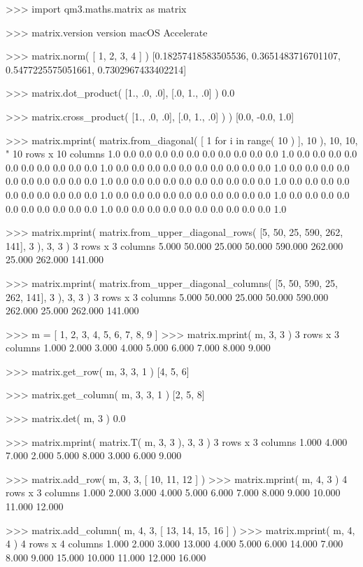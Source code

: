 \footnotesize
\begin{pyglist}[language=python,fvset={frame=single}]
>>> import qm3.maths.matrix as matrix

>>> matrix.version
version macOS Accelerate

>>> matrix.norm( [ 1, 2, 3, 4 ] )
[0.18257418583505536, 0.3651483716701107, 0.5477225575051661, 0.7302967433402214]

>>> matrix.dot_product( [1., .0, .0], [.0, 1., .0] )
0.0

>>> matrix.cross_product( [1., .0, .0], [.0, 1., .0] ) )
[0.0, -0.0, 1.0]

>>> matrix.mprint( matrix.from_diagonal( [ 1 for i in range( 10 ) ], 10 ), 10, 10, "%
10 rows x 10 columns
1.0 0.0 0.0 0.0 0.0 0.0 0.0 0.0 0.0 0.0 
0.0 1.0 0.0 0.0 0.0 0.0 0.0 0.0 0.0 0.0 
0.0 0.0 1.0 0.0 0.0 0.0 0.0 0.0 0.0 0.0 
0.0 0.0 0.0 1.0 0.0 0.0 0.0 0.0 0.0 0.0 
0.0 0.0 0.0 0.0 1.0 0.0 0.0 0.0 0.0 0.0 
0.0 0.0 0.0 0.0 0.0 1.0 0.0 0.0 0.0 0.0 
0.0 0.0 0.0 0.0 0.0 0.0 1.0 0.0 0.0 0.0 
0.0 0.0 0.0 0.0 0.0 0.0 0.0 1.0 0.0 0.0 
0.0 0.0 0.0 0.0 0.0 0.0 0.0 0.0 1.0 0.0 
0.0 0.0 0.0 0.0 0.0 0.0 0.0 0.0 0.0 1.0 

>>> matrix.mprint( matrix.from_upper_diagonal_rows( [5, 50, 25, 590, 262, 141], 3 ), 3, 3 )
3 rows x 3 columns
   5.000   50.000   25.000 
  50.000  590.000  262.000 
  25.000  262.000  141.000 

>>> matrix.mprint( matrix.from_upper_diagonal_columns( [5, 50, 590, 25, 262, 141], 3 ), 3, 3 )
3 rows x 3 columns
   5.000   50.000   25.000 
  50.000  590.000  262.000 
  25.000  262.000  141.000 

>>> m = [ 1, 2, 3, 4, 5, 6, 7, 8, 9 ]
>>> matrix.mprint( m, 3, 3 )
3 rows x 3 columns
   1.000    2.000    3.000 
   4.000    5.000    6.000 
   7.000    8.000    9.000 

>>> matrix.get_row( m, 3, 3, 1 )
[4, 5, 6]

>>> matrix.get_column( m, 3, 3, 1 )
[2, 5, 8]

>>> matrix.det( m, 3 )
0.0

>>> matrix.mprint( matrix.T( m, 3, 3 ), 3, 3 )
3 rows x 3 columns
   1.000    4.000    7.000 
   2.000    5.000    8.000 
   3.000    6.000    9.000 

>>> matrix.add_row( m, 3, 3, [ 10, 11, 12 ] )
>>> matrix.mprint( m, 4, 3 )
4 rows x 3 columns
   1.000    2.000    3.000 
   4.000    5.000    6.000 
   7.000    8.000    9.000 
  10.000   11.000   12.000 

>>> matrix.add_column( m, 4, 3, [ 13, 14, 15, 16 ] )
>>> matrix.mprint( m, 4, 4 )
4 rows x 4 columns
   1.000    2.000    3.000   13.000 
   4.000    5.000    6.000   14.000 
   7.000    8.000    9.000   15.000 
  10.000   11.000   12.000   16.000 


\end{pyglist}
